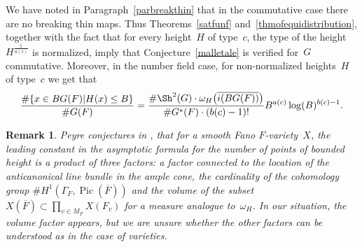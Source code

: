 \documentclass[a4paper,english,12pt]{amsart}
\newcommand{\QQ}{\mathbb{Q}}
\newcommand{\ZZ}{\mathbb{Z}}
\newcommand{\vMF}{v\in M_F}
\newcommand{\muu}{\boldsymbol{\mu}}
\DeclareMathOperator{\Pic}{Pic}
\newtheorem{rem}[equation]{Remark}
\numberwithin{equation}{subsection}
\begin{document}
%
We have noted in Paragraph~\ref{parbreakthin} that in the commutative case there are no breaking thin maps. Thus Theorems~\ref{satfunf} and~\ref{thmofequidistribution}, together with the fact that for every height~$H$ of type~$c$, the type of the height~$H^{\frac{1}{a(c)}}$ is normalized, imply that Conjecture~\ref{malletale} is verified for~$G$ commutative. Moreover, in the number field case, for non-normalized heights~$H$ of type~$c$ we get that 
\begin{align*}\frac{\#\{x\in BG(F)|H(x)\leq B\}}{\# G(F)}=\frac{\#\Sh^2(G)\cdot\omega_H\big(\overline{i(BG(F))}\big)}{\# G^*(F)\cdot (b(c)-1)!}B^{a(c)}\log(B)^{b(c)-1}.
\end{align*}
\begin{rem}
 \normalfont Peyre conjectures in \cite{Peyre}, that for a smooth Fano $F$-variety~$X$, the leading constant in the asymptotic formula for the number of points of bounded height is a product of three factors: a factor connected to the location of the anticanonical line bundle in the ample cone, the cardinality of the cohomology group $\# H^1(\Gamma_F, \Pic(\overline F))$ and the volume of the subset~$X(\overline F)\subset \prod_{\vMF}X(F_v)$ for a measure analogue to~$\omega_H$. In our situation, the volume factor appears, but we are unsure whether the other factors can be understood as in the case of varieties.
\end{rem}


\end{document}
